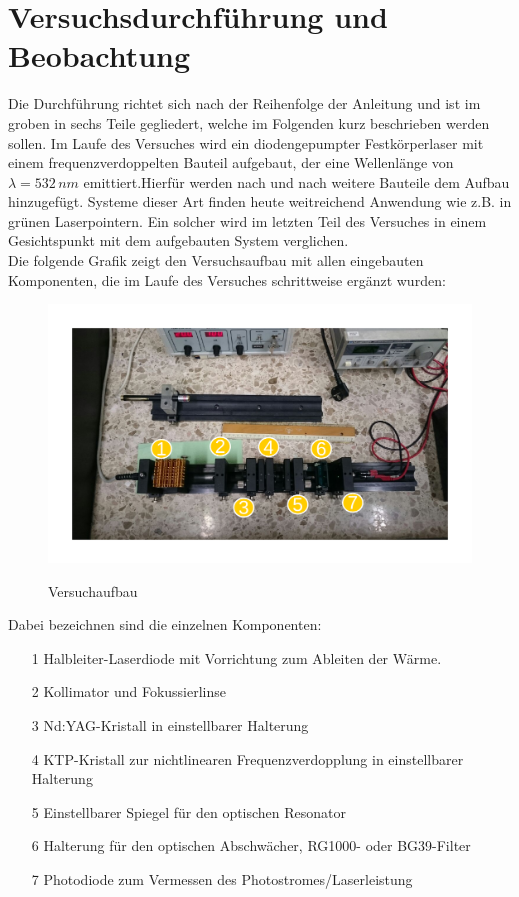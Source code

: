 \documentclass[twoside,colorback,accentcolor=tud4c,11pt]{tudreport}
\begin{document}
\chapter{Versuchsdurchführung und Beobachtung}
Die Durchführung richtet sich nach der Reihenfolge der Anleitung und ist im groben in sechs Teile gegliedert, welche im Folgenden kurz beschrieben werden sollen. Im Laufe des Versuches wird ein diodengepumpter Festkörperlaser mit einem frequenzverdoppelten Bauteil aufgebaut, der eine Wellenlänge von $\lambda =532\,\si{nm}$ emittiert.Hierfür werden nach und nach weitere Bauteile dem Aufbau hinzugefügt. Systeme dieser Art finden heute weitreichend Anwendung wie z.B. in grünen Laserpointern. Ein solcher wird im letzten Teil des Versuches in einem Gesichtspunkt mit dem aufgebauten System verglichen.\\
Die folgende Grafik zeigt den Versuchsaufbau mit allen eingebauten Komponenten, die im Laufe des Versuches schrittweise ergänzt wurden:
\begin{figure}[H]
\centering
   	\begin{minipage}[b]{0.9\textwidth}
   	\includegraphics[width=\textwidth]{graphics/aufbau.pdf}
  	\label{vauf}
   	\end{minipage}
\caption{Versuchaufbau}	
\end{figure}
Dabei bezeichnen sind die einzelnen Komponenten:
\begin{itemize}
\item[1] Halbleiter-Laserdiode mit Vorrichtung zum Ableiten der Wärme.
\item[2] Kollimator und Fokussierlinse
\item[3] Nd:YAG-Kristall in einstellbarer Halterung
\item[4] KTP-Kristall zur nichtlinearen Frequenzverdopplung in einstellbarer Halterung
\item[5] Einstellbarer Spiegel für den optischen Resonator
\item[6] Halterung für den optischen Abschwächer, RG1000- oder BG39-Filter
\item[7] Photodiode zum Vermessen des Photostromes/Laserleistung
\end{itemize}
\end{document}
